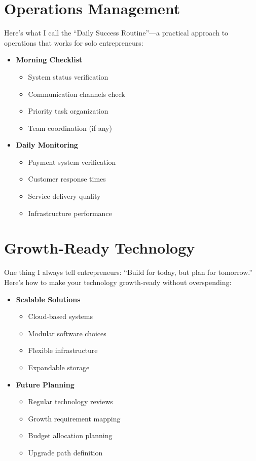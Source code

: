 \section{Operations Management}\label{sec:operations-management}

Here's what I call the ``Daily Success Routine''—a practical approach to operations that works for solo entrepreneurs:

\begin{itemize}
    \item \textbf{Morning Checklist}
    \begin{itemize}
        \item System status verification
        \item Communication channels check
        \item Priority task organization
        \item Team coordination (if any)
    \end{itemize}

    \item \textbf{Daily Monitoring}
    \begin{itemize}
        \item Payment system verification
        \item Customer response times
        \item Service delivery quality
        \item Infrastructure performance
    \end{itemize}
\end{itemize}

\section{Growth-Ready Technology}\label{sec:growth-ready}

One thing I always tell entrepreneurs: ``Build for today, but plan for tomorrow.'' Here's how to make your technology growth-ready without overspending:

\begin{itemize}
    \item \textbf{Scalable Solutions}
    \begin{itemize}
        \item Cloud-based systems
        \item Modular software choices
        \item Flexible infrastructure
        \item Expandable storage
    \end{itemize}

    \item \textbf{Future Planning}
    \begin{itemize}
        \item Regular technology reviews
        \item Growth requirement mapping
        \item Budget allocation planning
        \item Upgrade path definition
    \end{itemize}
\end{itemize}

